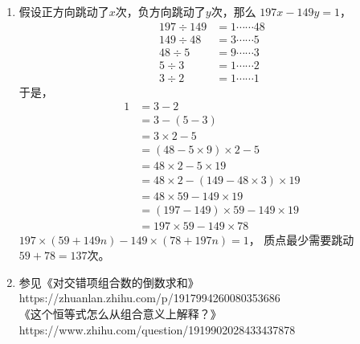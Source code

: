 \begin{enumerate}[label={\textbf{\thechapter.\arabic*}},leftmargin=
    \inteval{\myenumleftmargin}pt]
\item 假设正方向跳动了$x$次，负方向跳动了$y$次，那么
$ 197x-149y=1 $，
\begin{align*}
    197\div 149 &=1 \cdots\cdots 48 \\
    149\div  48 &=3 \cdots\cdots 5  \\
    48\div   5 &=9 \cdots\cdots 3 \\
    5\div   3 &=1 \cdots\cdots 2 \\
    3\div   2 &=1 \cdots\cdots 1 
\end{align*}
于是，
\begin{align*}
    1 &= 3-2 \\
    &= 3-(5-3) \\
    &= 3\times 2-5\\
    &= (48-5\times 9)\times 2-5\\
    &= 48\times 2-5\times 19 \\
    &= 48\times 2-(149-48\times 3)\times 19 \\
    &= 48\times 59-149\times 19 \\
    &= (197-149)\times 59-149\times 19 \\
    &= 197\times 59-149\times 78    
\end{align*}
$ 197\times(59+149n)-149\times(78+197n)=1 $，
质点最少需要跳动$59+78=137$次。

\item 参见《对交错项组合数的倒数求和》\\
https://zhuanlan.zhihu.com/p/1917994260080353686  \\
《这个恒等式怎么从组合意义上解释？》 \\
https://www.zhihu.com/question/1919902028433437878
 
\end{enumerate}
\myfootnote{\CopyrightStatementChap}
\cleardoublepage

